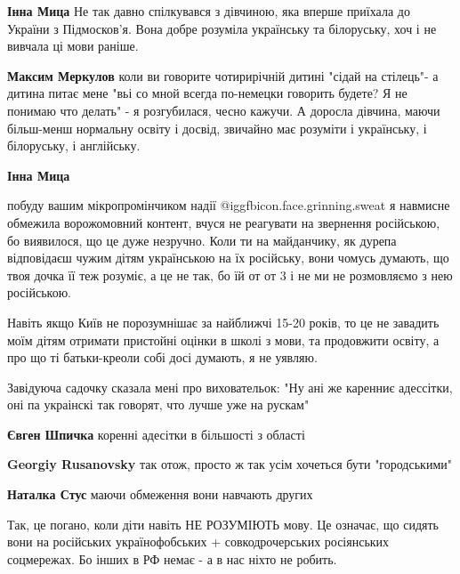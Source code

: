 \begin{itemize}
\begin{itemize} %
\textbf{Інна Мица} Не так давно спілкувався з дівчиною, яка вперше приїхала до України з Підмосков'я. Вона добре розуміла українську та білоруську, хоч і не вивчала ці мови раніше.

\textbf{Максим Меркулов} коли ви говорите чотирирічній дитині "сідай на стілець"- а дитина питає мене "вьі со мной всегда по-немецки говорить будете? Я не понимаю что делать" - я розгубилася, чесно кажучи. А доросла дівчина, маючи більш-менш нормальну освіту і досвід, звичайно має розуміти і українську, і білоруську, і англійську.

\textbf{Інна Мица} 

побуду вашим мікропромінчиком надії @igg{fbicon.face.grinning.sweat} я навмисне обмежила ворожомовний контент,
вчуся не реагувати на звернення російською, бо виявилося, що це дуже незручно.
Коли ти на майданчику, як дурепа відповідаєш чужим дітям українською на їх
російську, вони чомусь думають, що твоя дочка її теж розуміє, а це не так, бо
їй от от 3 і не ми не розмовляємо з нею російською.

Навіть якщо Київ не порозумнішає за найближчі 15-20 років, то це не завадить
моїм дітям отримати пристойні оцінки в школі з мови, та продовжити освіту, а
про що ті батьки-креоли собі досі думають, я не уявляю.

\end{itemize} %


Завідуюча садочку сказала мені про виховательок: "Ну ані же каренниє адессітки,
оні па украінскі так говорят, что лучше уже на рускам"

\begin{itemize} %
\textbf{Євген Шпичка} коренні адесітки в більшості з області

\textbf{Georgiy Rusanovsky} так отож, просто ж так усім хочеться бути "городськими"
\end{itemize} %

\textbf{Наталка Стус} маючи обмеження вони навчають других


Так, це погано, коли діти навіть НЕ РОЗУМІЮТЬ мову. Це означає, що сидять вони
на російських українофобських + совкодрочерських росіянських соцмережах. Бо
інших в РФ немає - а в нас ніхто не робить.


\end{itemize}
